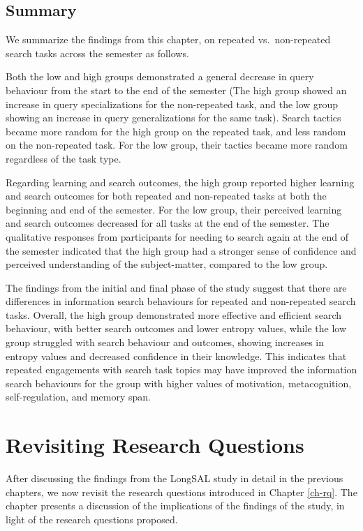 \documentclass[letterpaper, nobind]{templates/ociamthesis}
\begin{document}
\hypertarget{summary}{%
\section{Summary}\label{summary}}

We summarize the findings from this chapter, on repeated vs.~non-repeated search tasks across the semester as follows.

Both the low and high groups demonstrated a general decrease in query behaviour from the start to the end of the semester
(The high group showed an increase in query specializations for the non-repeated task, and the low group showing an increase in query generalizations for the same task).
Search tactics became more random for the high group on the repeated task, and less random on the non-repeated task.
For the low group, their tactics became more random regardless of the task type.

Regarding learning and search outcomes, the high group reported higher learning and search outcomes for both repeated and non-repeated tasks at both the beginning and end of the semester.
For the low group, their perceived learning and search outcomes decreased for all tasks at the end of the semester.
The qualitative responses from participants for needing to search again at the end of the semester indicated that the high group had a stronger sense of confidence and perceived understanding of the subject-matter, compared to the low group.

The findings from the initial and final phase of the study suggest that there are differences in information search behaviours for repeated and non-repeated search tasks.
Overall, the high group demonstrated more effective and efficient search behaviour, with better search outcomes and lower entropy values, while the low group struggled with search behaviour and outcomes, showing increases in entropy values and decreased confidence in their knowledge.
This indicates that repeated engagements with search task topics may have improved the information search behaviours for the group with higher values of motivation, metacognition, self-regulation, and memory span.

\hypertarget{revisiting-research-questions}{%
\chapter{Revisiting Research Questions}\label{revisiting-research-questions}}

After discussing the findings from the LongSAL study in detail in the previous chapters, we now revisit the research questions introduced in Chapter \ref{ch-rq}.
The chapter presents a discussion of the implications of the findings of the study, in light of the research questions proposed.
\end{document}
